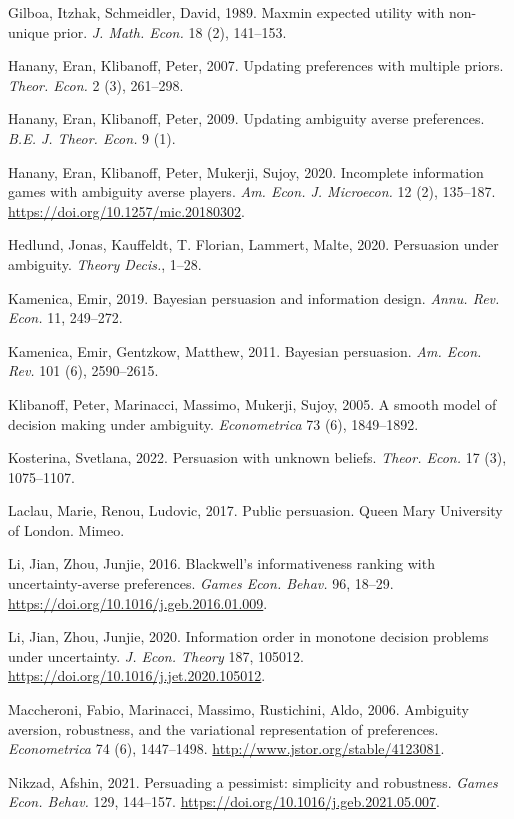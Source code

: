 \documentclass[12pt,a4paper]{article}
\theoremstyle{definition}
\theoremstyle{remark}
\newenvironment{original}{%
    \par\medskip\noindent%
    \begin{tcolorbox}[%
        colback=white,%
        colframe=black!50,%
        title=\textbf{Original English},%
        fonttitle=\small\bfseries,%
        left=0pt, right=0pt, top=2pt, bottom=2pt,%
        boxrule=0.5pt,%
        arc=0pt,%
        outer arc=0pt%
    ]%
    \small%
}{%
    \end{tcolorbox}%
}
\begin{document}
\begin{original}
\noindent Gilboa, Itzhak, Schmeidler, David, 1989. Maxmin expected utility with non-unique prior. \textit{J. Math. Econ.} 18 (2), 141--153.

\noindent Hanany, Eran, Klibanoff, Peter, 2007. Updating preferences with multiple priors. \textit{Theor. Econ.} 2 (3), 261--298.

\noindent Hanany, Eran, Klibanoff, Peter, 2009. Updating ambiguity averse preferences. \textit{B.E. J. Theor. Econ.} 9 (1).

\noindent Hanany, Eran, Klibanoff, Peter, Mukerji, Sujoy, 2020. Incomplete information games with ambiguity averse players. \textit{Am. Econ. J. Microecon.} 12 (2), 135--187. \url{https://doi.org/10.1257/mic.20180302}.

\noindent Hedlund, Jonas, Kauffeldt, T. Florian, Lammert, Malte, 2020. Persuasion under ambiguity. \textit{Theory Decis.}, 1--28.

\noindent Kamenica, Emir, 2019. Bayesian persuasion and information design. \textit{Annu. Rev. Econ.} 11, 249--272.

\noindent Kamenica, Emir, Gentzkow, Matthew, 2011. Bayesian persuasion. \textit{Am. Econ. Rev.} 101 (6), 2590--2615.

\noindent Klibanoff, Peter, Marinacci, Massimo, Mukerji, Sujoy, 2005. A smooth model of decision making under ambiguity. \textit{Econometrica} 73 (6), 1849--1892.

\noindent Kosterina, Svetlana, 2022. Persuasion with unknown beliefs. \textit{Theor. Econ.} 17 (3), 1075--1107.

\noindent Laclau, Marie, Renou, Ludovic, 2017. Public persuasion. Queen Mary University of London. Mimeo.

\noindent Li, Jian, Zhou, Junjie, 2016. Blackwell's informativeness ranking with uncertainty-averse preferences. \textit{Games Econ. Behav.} 96, 18--29. \url{https://doi.org/10.1016/j.geb.2016.01.009}.

\noindent Li, Jian, Zhou, Junjie, 2020. Information order in monotone decision problems under uncertainty. \textit{J. Econ. Theory} 187, 105012. \url{https://doi.org/10.1016/j.jet.2020.105012}.

\noindent Maccheroni, Fabio, Marinacci, Massimo, Rustichini, Aldo, 2006. Ambiguity aversion, robustness, and the variational representation of preferences. \textit{Econometrica} 74 (6), 1447--1498. \url{http://www.jstor.org/stable/4123081}.

\noindent Nikzad, Afshin, 2021. Persuading a pessimist: simplicity and robustness. \textit{Games Econ. Behav.} 129, 144--157. \url{https://doi.org/10.1016/j.geb.2021.05.007}.


\end{original}
\end{document}
